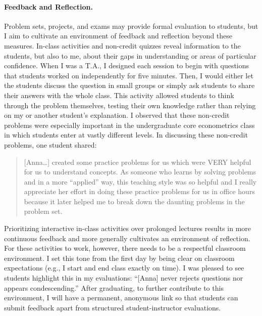 \paragraph{Feedback and Reflection.} Problem sets, projects, and exams may provide formal evaluation to students, but I aim to cultivate an environment of feedback and reflection beyond these measures. In-class activities and non-credit quizzes reveal information to the students, but also to me, about their gaps in understanding or areas of particular confidence. When I was a T.A., I designed each session to begin with questions that students worked on independently for five minutes. Then, I would either let the students discuss the question in small groups or simply ask students to share their answers with the whole class. This activity allowed students to think through the problem themselves, testing their own knowledge rather than relying on my or another student's explanation. I observed that these non-credit problems were especially important in the undergraduate core econometrics class in which students enter at vastly different levels. In discussing these non-credit problems, one student shared:

\begin{quote}
[Anna\ldots] created some practice problems for us which were VERY helpful for us to understand concepts. As someone who learns by solving problems and in a more ``applied'' way, this teaching style was so helpful and I really appreciate her effort in doing these practice problems for us in office hours because it later helped me to break down the daunting problems in the problem set.
\end{quote}

Prioritizing interactive in-class activities over prolonged lectures results in more continuous feedback and more generally cultivates an environment of reflection. For these activities to work, however, there needs to be a respectful classroom environment. I set this tone from the first day by being clear on classroom expectations (e.g., I start and end class exactly on time). I was pleased to see students highlight this in my evaluations: ``[Anna] never rejects questions nor appears condescending.'' After graduating, to further contribute to this environment, I will have a permanent, anonymous link so that students can submit feedback apart from structured student-instructor evaluations. 

